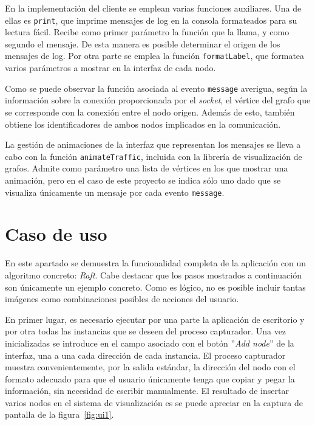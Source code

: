 En la implementación del cliente se emplean varias funciones auxiliares. Una de ellas es \texttt{print}, que imprime mensajes de log en la consola formateados para su lectura fácil. Recibe como primer parámetro la función que la llama, y como segundo el mensaje. De esta manera es posible determinar el origen de los mensajes de log. Por otra parte se emplea la función \texttt{formatLabel}, que formatea varios parámetros a mostrar en la interfaz de cada nodo.

Como se puede observar la función asociada al evento \texttt{message} averigua, según la información sobre la conexión proporcionada por el \textit{socket}, el vértice del grafo que se corresponde con la conexión entre el nodo origen. Además de esto, también obtiene los identificadores de ambos nodos implicados en la comunicación.

La gestión de animaciones de la interfaz que representan los mensajes se lleva a cabo con la función \texttt{animateTraffic}, incluida con la librería de visualización de grafos. Admite como parámetro una lista de vértices en los que mostrar una animación, pero en el caso de este proyecto se indica sólo uno dado que se visualiza únicamente un mensaje por cada evento \texttt{message}.

\section{Caso de uso}

En este apartado se demuestra la funcionalidad completa de la aplicación con un algoritmo concreto: \textit{Raft}. Cabe destacar que los pasos mostrados a continuación son únicamente un ejemplo concreto. Como es lógico, no es posible incluir tantas imágenes como combinaciones posibles de acciones del usuario.

En primer lugar, es necesario ejecutar por una parte la aplicación de escritorio y por otra todas las instancias que se deseen del proceso capturador. Una vez inicializadas se introduce en el campo asociado con el botón ''\textit{Add node}'' de la interfaz, una a una cada dirección de cada instancia. El proceso capturador muestra convenientemente, por la salida estándar, la dirección del nodo con el formato adecuado para que el usuario únicamente tenga que copiar y pegar la información, sin necesidad de escribir manualmente. El resultado de insertar varios nodos en el sistema de visualización es se puede apreciar en la captura de pantalla de la figura~\ref{fig:ui1}.

\newpage


